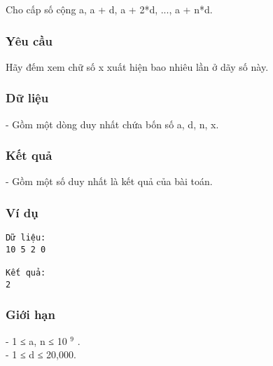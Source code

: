 



   Cho cấp số cộng a, a + d, a + 2*d, ..., a + n*d.  

\subsubsection{   Yêu cầu  }

   Hãy đếm xem chữ số x xuất hiện bao nhiêu lần ở dãy số này.  

\subsubsection{   Dữ liệu  }

   - Gồm một dòng duy nhất chứa bốn số a, d, n, x.  

\subsubsection{   Kết quả  }

   - Gồm một số duy nhất là kết quả của bài toán.  

\subsubsection{   Ví dụ  }
\begin{verbatim}
Dữ liệu:
10 5 2 0

Kết quả:
2
\end{verbatim}

\subsubsection{   Giới hạn  }

   - 1 ≤ a, n ≤ 10   $^    9   $   .   
\\   - 1 ≤ d ≤ 20,000.  